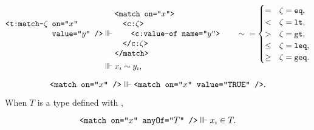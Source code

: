 \begin{axiom}
  \begin{alignat*}{2}
    \begin{aligned}[b]
      \xml{<t:match-$\zeta$ }&\xml{on="$x$"} \xmlnll
                             &\xml{value="$y$" />}
    \end{aligned}
    {}&\equivish{}
    \begin{aligned}
      &\xml{<match on="$x$">} \xmlnll
      &\quad \xml{<c:$\zeta$>} \xmlnll
      &\quad\quad \xml{<c:value-of name="$y$">} \xmlnll
      &\quad \xml{</c:$\zeta$>} \xmlnll
      &\xml{</match>}
    \end{aligned}
    \qquad
    \sim{} = \smash{\begin{cases}
             =    &\zeta=\xml{eq},  \\
             <    &\zeta=\xml{lt},  \\
             >    &\zeta=\xml{gt},  \\
             \leq &\zeta=\xml{leq}, \\
             \geq &\zeta=\xml{geq}.
           \end{cases}} \\
  &\equivish \varsub x \sim \varsub y,
  \end{alignat*}
\end{axiom}

\begin{axiom}
  \begin{equation*}
    \texttt{<match on="$x$" />}
      \Vvdash \texttt{<match on="$x$" value="TRUE" />}.
  \end{equation*}
\end{axiom}

\begin{axiom}
  When $T$ is a type defined with ,

  \begin{equation*}
    \texttt{<match on="$x$" anyOf="$T$" />} \Vvdash {x}_{\imath} \in T.
  \end{equation*}
\end{axiom}

